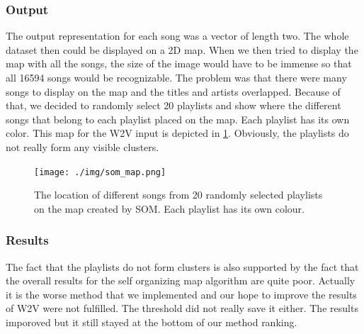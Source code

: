 \subsubsection{Output}
The output representation for each song was a vector of length two. The whole dataset then could be displayed on a 2D map. 
When we then tried to display the map with all the songs, the size of the image would have to be immense so that all 16594 songs would be recognizable. The problem was that there were many songs to display on the map and the titles and artists overlapped. Because of that, we decided to randomly select 20 playlists and show where the different songs that belong to each playlist placed on the map. Each playlist has its own color. This map for the W2V input is depicted in \ref{fig:som_map}. Obviously, the playlists do not really form any visible clusters.
\begin{figure}[h]
    \centering
	\texttt{[image: ./img/som\_map.png]}
	\caption{The location of different songs from 20 randomly selected playlists on the map created by SOM. Each playlist has its own colour.}
	\label{fig:som_map}
\end{figure}
\subsubsection{Results}
The fact that the playlists do not form clusters is also supported by the fact that the overall results for the self organizing map algorithm are quite poor. Actually it is the worse method that we implemented and our hope to improve the results of W2V were not fulfilled. The threshold did not really save it either. The results imporoved but it still stayed at the bottom of our method ranking.

